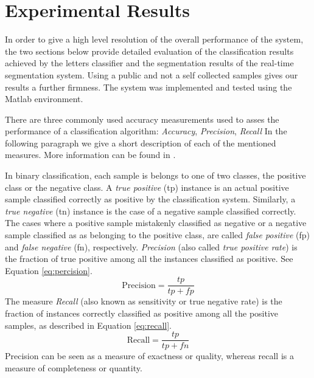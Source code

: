\section{Experimental Results}
\label{sec:classification_results}

In order to give a high level resolution of the overall performance of the system, the two sections below provide detailed evaluation of the classification results achieved by the letters classifier and the segmentation results of the real-time segmentation system.
Using a public and not a self collected samples gives our results a further firmness.
The system was implemented and tested using the Matlab environment.

\iftoggle{edit-mode}{\hspace{0pt}\marginpar{Precision and recall}}{}
There are three commonly used accuracy measurements used to asses the performance of a classification algorithm: \emph{Accuracy}, \emph{Precision}, \emph{Recall}
In the following paragraph we give a short description of each of the mentioned measures.
More information can be found in \cite{labatut2012accuracy}.

In binary classification, each sample is belongs to one of two classes, the positive class or the negative class.
A \emph{true positive} (tp) instance is an actual positive sample classified correctly as positive by the classification system.
Similarly, a \emph{true negative} (tn) instance is the case of a negative sample classified correctly.  
The cases where a positive sample mistakenly classified as negative or a negative sample classified as as belonging to the positive class, are called \emph{false positive} (fp) and \emph{false negative} (fn), respectively.
\emph{Precision} (also called \emph{true positive rate}) is the fraction of true positive among all the instances classified as positive. 
See Equation \ref{eq:percision}.
\begin{equation}
\text{Precision}=\frac{tp}{tp+fp}
\label{eq:percision}
\end{equation}
The measure \emph{Recall} (also known as sensitivity or true negative rate) is the fraction of instances correctly classified as positive among all the positive samples, as described in Equation \ref{eq:recall}.
\begin{equation}
\text{Recall}=\frac{tp}{tp+fn}  
\label{eq:recall}
\end{equation}
Precision can be seen as a measure of exactness or quality, whereas recall is a measure of completeness or quantity.

